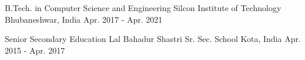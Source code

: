 

\begin{cventries}

  \cventry
    {B.Tech. in Computer Science and Engineering} %
    {Silcon Institute of Technology} %
    {Bhubaneshwar, India} %
    {Apr. 2017 - Apr. 2021} %

  \cventry
    {Senior Secondary Education} %
    {Lal Bahadur Shastri Sr. Sec. School} %
    {Kota, India} %
    {Apr. 2015 - Apr. 2017} %

\end{cventries}
